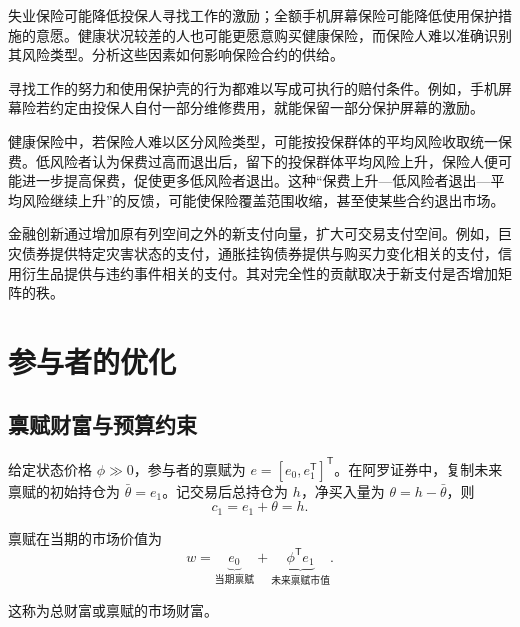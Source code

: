 \begin{tcolorbox}[example,title=课堂例题：保险合约为何可能缺失]
\begin{question}
失业保险可能降低投保人寻找工作的激励；全额手机屏幕保险可能降低使用保护措施的意愿。健康状况较差的人也可能更愿意购买健康保险，而保险人难以准确识别其风险类型。分析这些因素如何影响保险合约的供给。
\end{question}
\begin{solution}
寻找工作的努力和使用保护壳的行为都难以写成可执行的赔付条件。例如，手机屏幕险若约定由投保人自付一部分维修费用，就能保留一部分保护屏幕的激励。

健康保险中，若保险人难以区分风险类型，可能按投保群体的平均风险收取统一保费。低风险者认为保费过高而退出后，留下的投保群体平均风险上升，保险人便可能进一步提高保费，促使更多低风险者退出。这种“保费上升—低风险者退出—平均风险继续上升”的反馈，可能使保险覆盖范围收缩，甚至使某些合约退出市场。
\end{solution}
\end{tcolorbox}

金融创新通过增加原有列空间之外的新支付向量，扩大可交易支付空间。例如，巨灾债券提供特定灾害状态的支付，通胀挂钩债券提供与购买力变化相关的支付，信用衍生品提供与违约事件相关的支付。其对完全性的贡献取决于新支付是否增加矩阵的秩。

\section{参与者的优化}
\subsection{禀赋财富与预算约束}
\label{sec:wj-three-budget}
\begin{tcolorbox}[knowledge,title=初始持仓、总持仓与净交易]
给定状态价格 $\phi\gg0$，参与者的禀赋为 $e=[e_0,e_1^{\mathsf T}]^{\mathsf T}$。在阿罗证券中，复制未来禀赋的初始持仓为 $\bar\theta=e_1$。记交易后总持仓为 $h$，净买入量为 $\theta=h-\bar\theta$，则
\[
 c_1=e_1+\theta=h.
\]
\end{tcolorbox}

\begin{tcolorbox}[knowledge,title=禀赋的市场财富]
禀赋在当期的市场价值为
\begin{equation}
 w=\underbrace{e_0}_{\text{当期禀赋}}
   +\underbrace{\phi^{\mathsf T}e_1}_{\text{未来禀赋市值}}.\label{eq:wj-three-wealth}
\end{equation}

这称为总财富或禀赋的市场财富。
\end{tcolorbox}


